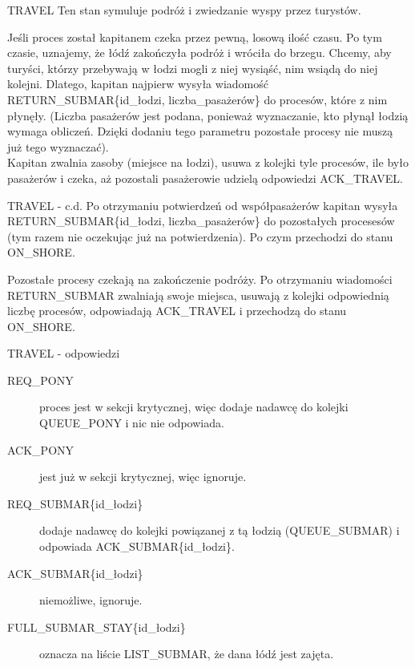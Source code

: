 \documentclass{beamer}
\begin{document}
\begin{frame}{TRAVEL}
    \internallinenumbers
    \resetlinenumber[1]
    Ten stan symuluje podróż i zwiedzanie wyspy przez turystów.

    \vspace{0.4cm}
    Jeśli proces został kapitanem czeka przez pewną, losową ilość czasu. Po tym czasie, uznajemy, że łódź zakończyła podróż i wróciła do brzegu. Chcemy, aby turyści, którzy przebywają w łodzi mogli z niej wysiąść, nim wsiądą do niej kolejni. Dlatego, kapitan najpierw wysyła wiadomość RETURN\_SUBMAR\{id\_łodzi, liczba\_pasażerów\} do procesów, które z nim płynęły. (Liczba pasażerów jest podana, ponieważ wyznaczanie, kto płynął łodzią wymaga obliczeń. Dzięki dodaniu tego parametru pozostałe procesy nie muszą już tego wyznaczać). \\
    Kapitan zwalnia zasoby (miejsce na łodzi), usuwa z kolejki tyle procesów, ile było pasażerów i czeka, aż pozostali pasażerowie udzielą odpowiedzi ACK\_TRAVEL.
\end{frame}

\begin{frame}{TRAVEL - c.d.}
    \internallinenumbers
    Po otrzymaniu potwierdzeń od współpasażerów kapitan wysyła RETURN\_SUBMAR\{id\_łodzi, liczba\_pasażerów\} do pozostałych procesesów (tym razem nie oczekując już na potwierdzenia). Po czym przechodzi do stanu ON\_SHORE.

    \vspace{0.4cm}
    Pozostałe procesy czekają na zakończenie podróży. Po otrzymaniu wiadomości RETURN\_SUBMAR zwalniają swoje miejsca, usuwają z kolejki odpowiednią liczbę procesów, odpowiadają ACK\_TRAVEL i przechodzą do stanu ON\_SHORE.
\end{frame}

\begin{frame}{TRAVEL - odpowiedzi}
    \internallinenumbers
    \resetlinenumber[1]
    \begin{description}
        \item [REQ\_PONY] proces jest w sekcji krytycznej, więc dodaje nadawcę do kolejki QUEUE\_PONY i nic nie odpowiada. 
        \item [ACK\_PONY] jest już w sekcji krytycznej, więc ignoruje.
        \item [REQ\_SUBMAR\{id\_łodzi\}] dodaje nadawcę do kolejki powiązanej z tą łodzią (QUEUE\_SUBMAR) i odpowiada ACK\_SUBMAR\{id\_łodzi\}.
        \item [ACK\_SUBMAR\{id\_łodzi\}] niemożliwe, ignoruje.
        \item [FULL\_SUBMAR\_STAY\{id\_łodzi\}] oznacza na liście LIST\_SUBMAR, że dana łódź jest zajęta.
    \end{description}
\end{frame}
\end{document}
